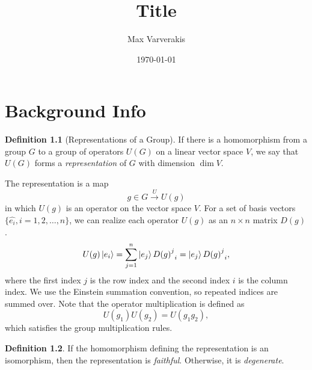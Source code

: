 \documentclass[12pt]{report}
\title{
{Title}\\
}
\author{Max Varverakis}
\date{\today}
\theoremstyle{definition}
\newtheorem{definition}{Definition}[chapter]
\begin{document}
\maketitle

\chapter{Background Info}

\begin{definition}[Representations of a Group]
    If there is a homomorphism from a group $G$ to a group of operators $U(G)$ on a linear vector space $V$, we say that $U(G)$ forms a \textit{representation} of $G$ with dimension $\dim V$.
\end{definition}

The representation is a map
\begin{equation}
    g\in G\xrightarrow{U} U(g)
\end{equation}
in which $U(g)$ is an operator on the vector space $V$. For a set of basis vectors $\{\hat{e_i},i=1,2,\dots,n\}$, we can realize each operator $U(g)$ as an $n\times n$ matrix $D(g)$.
\begin{equation}
    U(g)\ket{e_i} = \sum_{j=1}^n \ket{e_j}{{D(g)}^j}_i = \ket{e_j}{{D(g)}^j}_i,
\end{equation}
where the first index $j$ is the row index and the second index $i$ is the column index. We use the Einstein summation convention, so repeated indices are summed over. Note that the operator multiplication is defined as
\begin{equation}
    U(g_1)U(g_2) = U(g_1g_2),
\end{equation}
which satisfies the group multiplication rules.

\begin{definition}
    If the homomorphism defining the representation is an isomorphism, then the representation is \textit{faithful}. Otherwise, it is \textit{degenerate}.
\end{definition}
\end{document}
